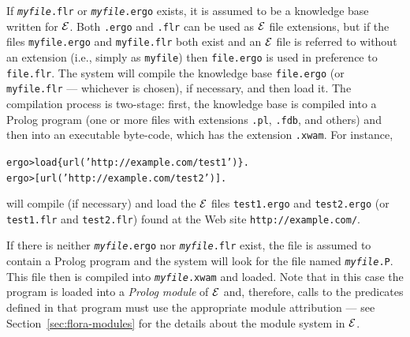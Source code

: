 \documentclass[11pt]{article}
\newcommand{\FLORA}{{\mbox{\smaller{\sc ${\cal F}${lora}\rm\emph{-2}}}}\xspace}
\newcommand{\ERGO}{\mbox{\ensuremath{\cal{E}}\smaller{{\sc{RGO}}}}\xspace}
\newcommand{\FLSYSTEM}{\ERGO}
\newcommand{\prompt}{ergo> }
\newcommand{\flrext}{flr\xspace}
\newcommand{\ergoext}{ergo\xspace}
\newcommand{\ignore}[1]{}
\newcommand{\ofile}{xwam}
\begin{document}
If \texttt{\textit{myfile}.\flrext} or \texttt{\textit{myfile}.\ergoext} exists, it is assumed to be a knowledge
base written for \FLSYSTEM.
Both \texttt{.\ergoext} and \texttt{.\flrext} can be used as \FLSYSTEM file
extensions, but if the files
\texttt{myfile.\ergoext} and \texttt{myfile.\flrext} both
exist and an \FLSYSTEM file is referred to without an extension (i.e.,
simply as \texttt{myfile}) then \texttt{file.\ergoext} is used in preference to
\texttt{file.\flrext}.  
The system will compile the knowledge base \texttt{file.\ergoext} (or
\texttt{myfile.\flrext} --- whichever is chosen), if necessary, and then load it. The
compilation process is two-stage: first, the knowledge base is compiled into a
Prolog program (one or more files with extensions {\tt .pl}, {\tt .fdb}, and
others)
and then into an executable byte-code, which has the extension {\tt .\ofile}.
For instance, 
\begin{alltt}
  \prompt load\{url('http://example.com/test1')\}.
  \prompt [url('http://example.com/test2')].
\end{alltt}
will compile (if necessary) and load the \FLSYSTEM files
{\tt test1.\ergoext} and
{\tt test2.\ergoext}
(or {\tt test1.\flrext} and
{\tt test2.\flrext})
found at the Web site {\tt http://example.com/}.   

If there is neither \texttt{\textit{myfile}.\ergoext} nor
\texttt{\textit{myfile}.\flrext} exist, the file is assumed to contain
a Prolog program and the system will look for the file named
\texttt{\textit{myfile}.P}. This file then is compiled into
\texttt{\textit{myfile}.\ofile} and
loaded. Note that in this case the program is loaded into a {\em Prolog
  module} of \FLSYSTEM and, therefore, calls to the predicates defined in that
program must use the appropriate module attribution --- see
Section~\ref{sec:flora-modules} for the details about the module system in
\FLSYSTEM.

\ignore{
However, if there are both
\texttt{program.ergo} and \texttt{program.flr} then \texttt{program.flr}
is ignored unless the \texttt{.flr} extension is \emph{explicitly}
mentioned. For instance, if the command \texttt{load\{'program.flr'\}}
is executed, then \texttt{program.flr} will be taken even if
\texttt{program.ergo} exists. On the other hand,
\texttt{load\{program\}} (without an explicit extension)
will try to load \texttt{program.ergo}
first. If this file does not exist, \texttt{program.flr} will be tried.
If that file is not found, \texttt{program.P} will be attempted followed by
\texttt{program.xwam}.
}
\end{document}
